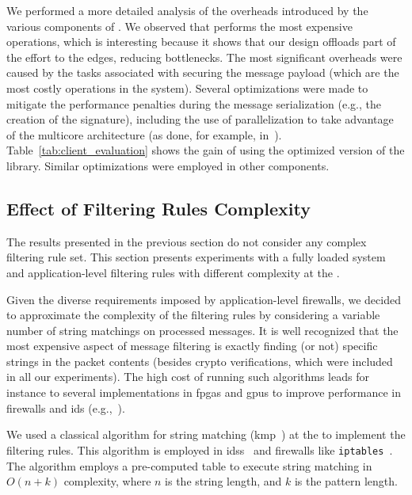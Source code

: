 We performed a more detailed analysis of the overheads introduced by the various components of \sieveq.
We observed that \sender performs the most expensive operations, which is interesting because it shows that our design offloads part of the effort to the edges, reducing bottlenecks.
The most significant overheads were caused by the tasks associated with securing the message payload (which are the most costly operations in the system). Several optimizations were made to mitigate the performance penalties during the message serialization (e.g., the creation of the signature), including the use of parallelization to take advantage of the multicore architecture (as done, for example, in~\cite{Kirsch:2014}).
Table~\ref{tab:client_evaluation} shows the gain of using the optimized version of the \sender library. 
Similar optimizations were employed in other components.



\subsection{Effect of Filtering Rules Complexity}


The results presented in the previous section do not consider any complex filtering rule set.
This section presents experiments with a fully loaded system and application-level filtering rules with different complexity at the \repsieves.

Given the diverse requirements imposed by application-level firewalls, we decided to approximate the complexity of the filtering rules by considering a variable number of string matchings on processed messages.  It is well recognized that the most expensive aspect of message filtering is exactly finding (or not) specific strings in the packet contents (besides crypto verifications, which were included in all our experiments). 
The high cost of running such algorithms leads for instance to several implementations in \glspl{fpga} and \glspl{gpu} to improve performance in firewalls and \gls{ids} (e.g.,~\cite{Moscola:2003,Lee:2015}).

We used a classical algorithm for string matching (\gls{kmp}~\cite{Knuth:1977}) at the \repsieves to implement the filtering rules.
This algorithm is employed in \glspl{ids}~\cite{Prabha:2014} and firewalls like \texttt{iptables}~\cite{iptables}.
The algorithm employs a pre-computed table to execute string matching in $O(n + k)$ complexity, where $n$ is the string length, and $k$ is the pattern length.


